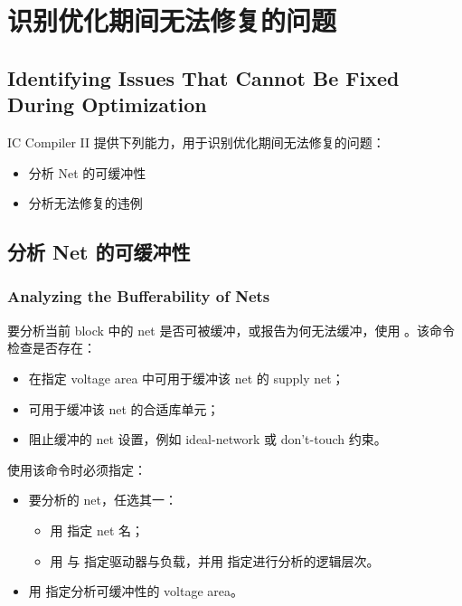 \section{识别优化期间无法修复的问题}
\subsection*{Identifying Issues That Cannot Be Fixed During Optimization}

IC Compiler II 提供下列能力，用于识别优化期间无法修复的问题：
\begin{itemize}
  \item 分析 Net 的可缓冲性
  \item 分析无法修复的违例
\end{itemize}

\subsection{分析 Net 的可缓冲性}
\subsubsection*{Analyzing the Bufferability of Nets}

要分析当前 block 中的 net 是否可被缓冲，或报告为何无法缓冲，使用 。该命令检查是否存在：
\begin{itemize}
  \item 在指定 voltage area 中可用于缓冲该 net 的 supply net；
  \item 可用于缓冲该 net 的合适库单元；
  \item 阻止缓冲的 net 设置，例如 ideal-network 或 don’t-touch 约束。
\end{itemize}

使用该命令时必须指定：
\begin{itemize}
  \item 要分析的 net，任选其一：
        \begin{itemize}
          \item 用  指定 net 名；
          \item 用  与  指定驱动器与负载，并用  指定进行分析的逻辑层次。
        \end{itemize}
  \item 用  指定分析可缓冲性的 voltage area。
\end{itemize}

